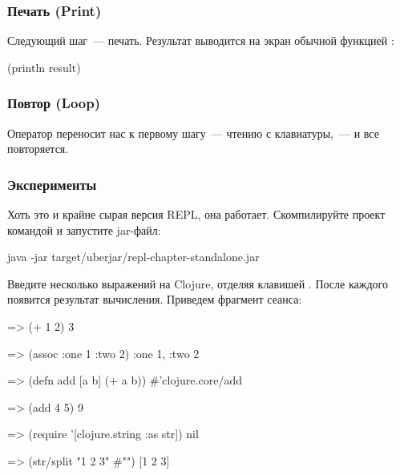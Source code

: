 \subsubsection{Печать (Print)}


Следующий шаг~--- печать. Результат  выводится на экран обычной функцией :

\begin{english}
  \begin{clojure}
(println result)
  \end{clojure}
\end{english}

\subsubsection{Повтор (Loop)}


Оператор  переносит нас к первому шагу~--- чтению с клавиатуры,~--- и все повторяется.

\subsubsection{Эксперименты}

Хоть это и крайне сырая версия REPL, она работает. Скомпилируйте проект командой  и запустите jar-файл:

\begin{english}
  \begin{clojure}
java -jar target/uberjar/repl-chapter-standalone.jar
  \end{clojure}
\end{english}

Введите несколько выражений на Clojure, отделяя клавишей \enter. После каждого появится результат вычисления. Приведем фрагмент сеанса:

\begin{english}
  \begin{clojure}
=> (+ 1 2)
3

=> (assoc {:one 1} :two 2)
{:one 1, :two 2}

=> (defn add [a b] (+ a b))
#'clojure.core/add

=> (add 4 5)
9

=> (require '[clojure.string :as str])
nil

=> (str/split "1 2 3" #"\s")
[1 2 3]
  \end{clojure}
\end{english}

